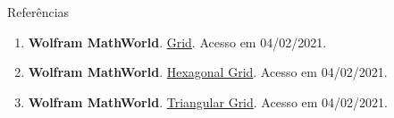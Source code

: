 \begin{frame}[fragile]{Referências}

    \begin{enumerate}
        \item \textbf{Wolfram MathWorld}. \href{https://mathworld.wolfram.com/Grid.html}{Grid}. Acesso em 04/02/2021.

        \item \textbf{Wolfram MathWorld}. \href{https://mathworld.wolfram.com/HexagonalGrid.html}{Hexagonal Grid}. Acesso em 04/02/2021.

        \item \textbf{Wolfram MathWorld}. \href{https://mathworld.wolfram.com/TriangularGrid.html}{Triangular Grid}. Acesso em 04/02/2021.
    \end{enumerate}

\end{frame}
